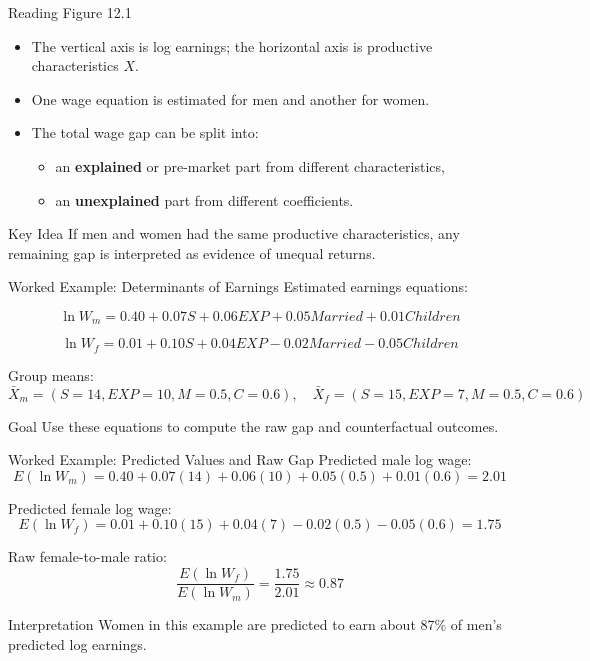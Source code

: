 \documentclass[aspectratio=169]{beamer}
\begin{document}
\begin{frame}{Reading Figure 12.1}
\transfade
\begin{itemize}
  \item The vertical axis is log earnings; the horizontal axis is productive characteristics \(X\).
  \item One wage equation is estimated for men and another for women.
  \item The total wage gap can be split into:
  \begin{itemize}
    \item an \textbf{explained} or pre-market part from different characteristics,
    \item an \textbf{unexplained} part from different coefficients.
  \end{itemize}
\end{itemize}

\begin{block}{Key Idea}
If men and women had the same productive characteristics, any remaining gap is interpreted as evidence of unequal returns.
\end{block}
\end{frame}

\begin{frame}{Worked Example: Determinants of Earnings}
\transfade
Estimated earnings equations:

\[
\ln W_m = 0.40 + 0.07S + 0.06EXP + 0.05Married + 0.01Children
\]

\[
\ln W_f = 0.01 + 0.10S + 0.04EXP - 0.02Married - 0.05Children
\]

Group means:
\[
\bar X_m = (S=14, EXP=10, M=0.5, C=0.6), \quad
\bar X_f = (S=15, EXP=7, M=0.5, C=0.6)
\]

\begin{block}{Goal}
Use these equations to compute the raw gap and counterfactual outcomes.
\end{block}
\end{frame}

\begin{frame}{Worked Example: Predicted Values and Raw Gap}
\transfade
Predicted male log wage:
\[
E(\ln W_m)=0.40+0.07(14)+0.06(10)+0.05(0.5)+0.01(0.6)=2.01
\]

Predicted female log wage:
\[
E(\ln W_f)=0.01+0.10(15)+0.04(7)-0.02(0.5)-0.05(0.6)=1.75
\]

Raw female-to-male ratio:
\[
\frac{E(\ln W_f)}{E(\ln W_m)}=\frac{1.75}{2.01}\approx 0.87
\]

\begin{block}{Interpretation}
Women in this example are predicted to earn about 87\% of men's predicted log earnings.
\end{block}
\end{frame}
\end{document}
